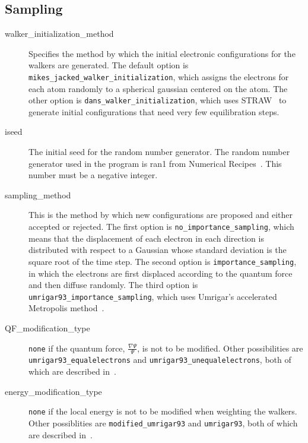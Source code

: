 \documentclass[11pt]{article}
\begin{document}
\subsection{Sampling}

\begin{description}

\item [walker\_initialization\_method] Specifies the method by which the
  initial electronic configurations for the walkers are generated.
  The default option is \verb-mikes_jacked_walker_initialization-, which
  assigns the electrons for each atom randomly to a spherical gaussian
  centered on the atom.  The other option is
  \verb-dans_walker_initialization-, which uses STRAW~\cite{STRAW} to
  generate initial configurations that need very few equilibration
  steps.

\item [iseed] The initial seed for the random number generator.
  The random number generator used in the program is ran1 from
  Numerical Recipes~\cite{Press93}.  This number must be a
  negative integer.

\item [sampling\_method] This is the method by which new configurations
  are proposed and either accepted or rejected.  The first option is
  \verb-no_importance_sampling-, which means that the displacement of
  each electron in each direction is distributed with respect to a
  Gaussian whose standard deviation is the square root of the time
  step.  The second option is \verb-importance_sampling-, in which the
  electrons are first displaced according to the quantum force and
  then diffuse randomly.  The third option is
  \verb-umrigar93_importance_sampling-, which uses Umrigar's
  accelerated Metropolis method~\cite{UmrigarNightingaleRunge1993}.  

\item [QF\_modification\_type] \verb-none- if the quantum force,
  $\frac{\nabla \Psi}{\Psi}$, is not to be modified.  Other
  possibilities are \verb-umrigar93_equalelectrons- and
  \verb-umrigar93_unequalelectrons-, both of which are described
  in~\cite{UmrigarNightingaleRunge1993}.  

\item [energy\_modification\_type] \verb-none- if the local energy
  is not to be modified when weighting the walkers.  Other
  possiblities are \verb-modified_umrigar93- and \verb-umrigar93-,
  both of which are described in~\cite{UmrigarNightingaleRunge1993}.


\end{description}
\end{document}
